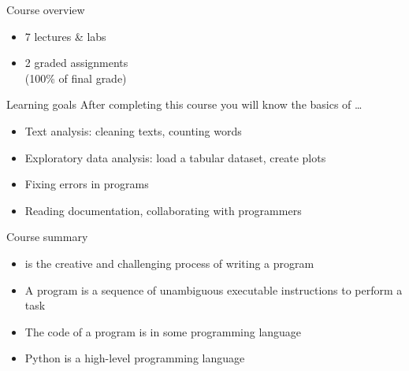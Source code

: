 \documentclass[aspectratio=169,usenames,dvipsnames]{beamer}
\begin{document}
\begin{frame}{Course overview}
    \begin{itemize}
       \item 7 lectures \& labs
       \item 2 graded assignments \\
           (100\% of final grade)
    \end{itemize}
\end{frame}

\begin{frame}{Learning goals}
    After completing this course you will know the basics of \dots
    \begin{itemize}
        \item Text analysis: cleaning texts, counting words
        \item Exploratory data analysis: load a tabular dataset, create plots
        \item Fixing errors in programs
        \item Reading documentation, collaborating with programmers
    \end{itemize}
\end{frame}



\begin{frame}{Course summary}
    \begin{itemize}
        \item {} is the creative and challenging process
            of writing a program
        \item A program is a sequence of unambiguous executable
            instructions to perform a task
        \item The code of a program is in some programming language
        \item Python is a high-level programming language
    \end{itemize}
\end{frame}
\end{document}
